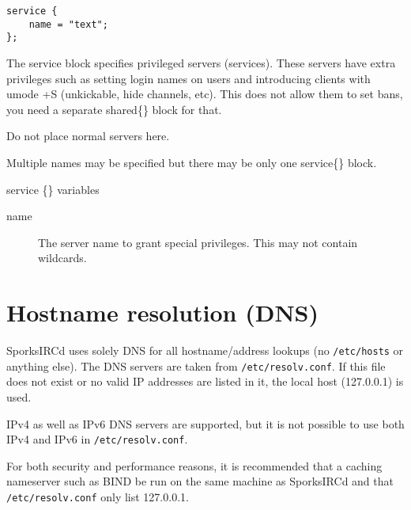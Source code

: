 \begin{verbatim}
service {
	name = "text";
};\end{verbatim}

	The service block specifies privileged servers (services). These
	servers have extra privileges such as setting login names on users
	and introducing clients with umode +S (unkickable, hide channels, etc).
	This does not allow them to set bans, you need a separate shared\{\}
	block for that.

	Do not place normal servers here.


	Multiple names may be specified but there may be only one service\{\}
	block.


{\sc service \{\} variables}
\nopagebreak

\noindent
\begin{description}
\item[{name}]
	The server name to grant special privileges. This may not
	contain wildcards.
\end{description}

\section{Hostname resolution (DNS)}

	SporksIRCd uses solely DNS for all hostname/address lookups
	(no \nolinkurl{/etc/hosts} or anything else).
	The DNS servers are taken from \nolinkurl{/etc/resolv.conf}.
	If this file does not exist or no valid IP addresses are listed in it,
	the local host (127.0.0.1) is used.


	IPv4 as well as IPv6 DNS servers are supported, but it is not
	possible to use both IPv4 and IPv6 in \nolinkurl{/etc/resolv.conf}.


	For both security and performance reasons, it is recommended
	that a caching nameserver such as BIND be run on the same machine
	as SporksIRCd and that \nolinkurl{/etc/resolv.conf} only
	list 127.0.0.1.
